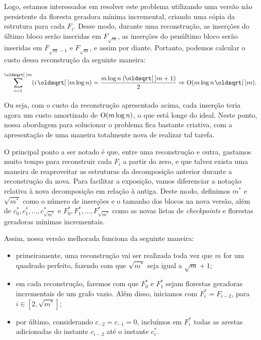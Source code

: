 Logo, estamos interessados em resolver este problema utilizando uma versão não persistente da floresta geradora mínima incremental, criando uma cópia da estrutura para cada $F_i$. Desse modo, durante uma reconstrução, as inserções do último bloco serão inseridas em $F_{\sqrt{m}}$, as inserções do penúltimo bloco serão inseridas em $F_{\sqrt{m} - 1}$ e $F_{\sqrt{m}}$, e assim por diante. Portanto, podemos calcular o custo dessa reconstrução da seguinte maneira:

\begin{equation}
    \sum_{i=1}^{\sqrt{m}} (i \sqrt{m} \log n) =
    \frac{m \log n \: (\sqrt{m} + 1)}{2} \Rightarrow
    \Oh(m \log n \sqrt{m}).
\end{equation}

Ou seja, com o custo da reconstrução apresentado acima, cada inserção teria agora um custo amortizado de $\mathrm{O}(m \log n)$, o que está longe do ideal. Neste ponto, nossa abordagem para solucionar o problema fica bastante criativa, com a apresentação de uma maneira totalmente nova de realizar tal tarefa.

O principal ponto a ser notado é que, entre uma reconstrução e outra, gastamos muito tempo para reconstruir cada $F_i$ a partir do zero, e que talvez exista uma maneira de reaproveitar as estruturas da decomposição anterior durante a reconstrução da nova. Para facilitar a exposição, vamos diferenciar a notação relativa à nova decomposição em relação à antiga. Deste modo, definimos $m^*$ e $\sqrt{m^*}$ como o número de inserções e o tamanho dos blocos na nova versão, além de $c_0^*, c_1^*, \dots, c_{\sqrt{m^*}}^*$ e $F_0^*, F_1^*, \dots, F_{\sqrt{m^*}}^*$ como as novas listas de \emph{checkpoints} e florestas geradoras mínimas incrementais.

Assim, nossa versão melhorada funciona da seguinte maneira:

\begin{itemize}
    \item primeiramente, uma reconstrução vai ser realizada toda vez que $m$ for um quadrado perfeito, fazendo com que $\sqrt{m^*} $ seja igual a $\sqrt{m} + 1$;
    \item em cada reconstrução, faremos com que $F_0^*$ e $F_1^*$ sejam florestas geradoras incrementais de um grafo vazio. Além disso, iniciamos com $F_i^* = F_{i-2}$, para $i \in [2, \sqrt{m^*}]$;
    \item por último, considerando $c_{-2} = c_{-1} = 0$, incluímos em $F_i^*$ todas as arestas adicionadas do instante $c_{i-2}$ até o instante $c_i^*$.
\end{itemize}

